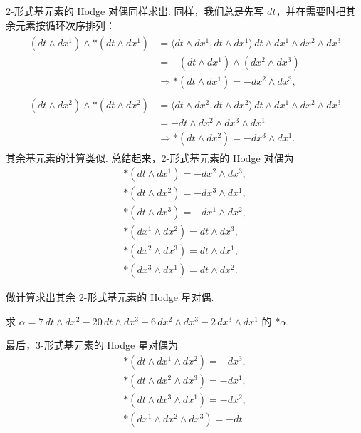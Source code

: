 2-形式基元素的 Hodge 对偶同样求出. 同样，我们总是先写 $dt$，并在需要时把其余元素按循环次序排列：
\begin{align*}
\begin{aligned}
(dt\wedge dx^1)\wedge\ast(dt\wedge dx^1)&=\langle dt\wedge dx^1,dt\wedge dx^1\rangle\,dt\wedge dx^1\wedge dx^2\wedge dx^3\\
&=-(dt\wedge dx^1)\wedge(dx^2\wedge dx^3)\\
&\Rightarrow\ast(dt\wedge dx^1)=-dx^2\wedge dx^3,
\end{aligned} \\
\begin{aligned}
(dt\wedge dx^2)\wedge\ast(dt\wedge dx^2)&=\langle dt\wedge dx^2,dt\wedge dx^2\rangle\,dt\wedge dx^1\wedge dx^2\wedge dx^3\\
&=-dt\wedge dx^2\wedge dx^3\wedge dx^1\\
&\Rightarrow\ast(dt\wedge dx^2)=-dx^3\wedge dx^1 .
\end{aligned}
\end{align*}
其余基元素的计算类似. 总结起来，2-形式基元素的 Hodge 对偶为
\begin{align*}
\ast(dt\wedge dx^1)=-dx^2\wedge dx^3, \\
\ast(dt\wedge dx^2)=-dx^3\wedge dx^1, \\
\ast(dt\wedge dx^3)=-dx^1\wedge dx^2, \\
\ast(dx^1\wedge dx^2)=dt\wedge dx^3, \\
\ast(dx^2\wedge dx^3)=dt\wedge dx^1, \\
\ast(dx^3\wedge dx^1)=dt\wedge dx^2 .
\end{align*}

\begin{question}\label{q:12-7}
做计算求出其余 2-形式基元素的 Hodge 星对偶.
\end{question}

\begin{question}\label{q:12-8}
求 $\alpha=7\,dt\wedge dx^2-20\,dt\wedge dx^3+6\,dx^2\wedge dx^3-2\,dx^3\wedge dx^1$ 的 $\ast\alpha$.
\end{question}

最后，3-形式基元素的 Hodge 星对偶为
\begin{align*}
\ast(dt\wedge dx^1\wedge dx^2)=-dx^3, \\
\ast(dt\wedge dx^2\wedge dx^3)=-dx^1, \\
\ast(dt\wedge dx^3\wedge dx^1)=-dx^2, \\
\ast(dx^1\wedge dx^2\wedge dx^3)=-dt .
\end{align*}

